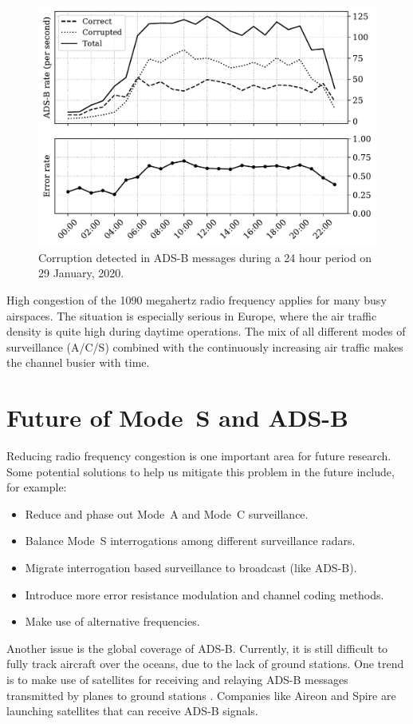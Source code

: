 \begin{figure}[ht]
    \centering
    \includegraphics[width=0.7\columnwidth]{figures/conclusion/adsb_corruption.pdf}
    \caption{Corruption detected in ADS-B messages during a 24 hour period on 29
    January, 2020.}
    \label{fig:adsb_corruption}
\end{figure}

High congestion of the 1090 megahertz radio frequency applies for many busy airspaces. The situation is especially serious in Europe, where the air traffic density is quite high during daytime operations. The mix of all different modes of surveillance (A/C/S) combined with the continuously increasing air traffic makes the channel busier with time.  

\section{Future of Mode~S and ADS-B}
Reducing radio frequency congestion is one important area for future research. Some potential solutions to help us mitigate this problem in the future include, for example:

\begin{itemize}
    \item Reduce and phase out Mode~A and Mode~C surveillance.
    \item Balance Mode~S interrogations among different surveillance radars.
    \item Migrate interrogation based surveillance to broadcast (like ADS-B).
    \item Introduce more error resistance modulation and channel coding methods.
    \item Make use of alternative frequencies.
\end{itemize}

Another issue is the global coverage of ADS-B. Currently, it is still difficult to fully track aircraft over the oceans, due to the lack of ground stations. One trend is to make use of satellites for receiving and relaying ADS-B messages transmitted by planes to ground stations \cite{noschese2011}. Companies like Aireon and Spire are launching satellites that can receive ADS-B signals. 


